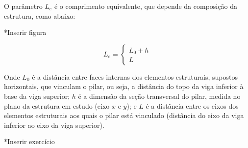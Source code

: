 O parâmetro $L_e$ é o comprimento equivalente, que depende da composição da estrutura, como abaixo:

*Inserir figura

\begin{equation}
	\label{equacao-comprimento-equivalente}
	L_e=\left\{
		\begin{array}{ll}
		L_0+h \\
		L
		\end{array}\right.
\end{equation}

Onde $L_0$ é a distância entre faces internas dos elementos estruturais, supostos horizontais, que vinculam o pilar, ou seja, a distância do topo da viga inferior à base da viga superior; $h$ é a dimensão da seção transversal do pilar, medida no plano da estrutura em estudo (eixo $x$ e $y$); e $L$ é a distância entre os eixos dos elementos estruturais aos quais o pilar está vinculado (distância do eixo da viga inferior ao eixo da viga superior).

*Inserir exercício